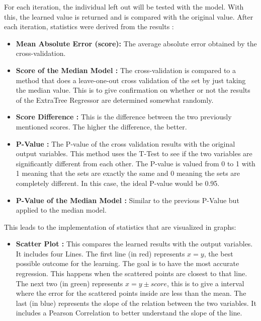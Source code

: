 \documentclass[a4paper,11pt]{report}
\numberwithin{figure}{section} %
\begin{document}
\begin{itemize}
        For each iteration, the individual left out will be tested with the model.
        With this, the learned value is returned and is compared with the original value.
        After each iteration, statistics were derived from the results :
        \begin{itemize}
            \item \textbf{Mean Absolute Error (score):} The average absolute error obtained by the cross-validation.
            \item \textbf{Score of the Median Model :} The cross-validation is compared to a method that does a leave-one-out cross validation of the set by just taking the median value.
            This is to give confirmation on whether or not the results of the ExtraTree Regressor are determined somewhat randomly.
            \item \textbf{Score Difference :} This is the difference between the two previously mentioned scores.
            The higher the difference, the better.
            \item \textbf{P-Value :} The P-value of the cross validation results with the original output variables.
            This method uses the T-Test to see if the two variables are significantly different from each other.
            The P-value is valued from 0 to 1 with 1 meaning that the sets are exactly the same and 0 meaning the sets are completely different.
            In this case, the ideal P-value would be 0.95.
            \item \textbf{P-Value of the Median Model :} Similar to the previous P-Value but applied to the median model.
        \end{itemize}
        This leads to the implementation of statistics that are visualized in graphs:
        \begin{itemize}
            \item \textbf{Scatter Plot :} This compares the learned results with the output variables.
            It includes four Lines.
            The first line (in red) represents $x = y$, the best possible outcome for the learning.
            The goal is to have the most accurate regression.
            This happens when the scattered points are closest to that line.
            The next two (in green) represents $x = y \pm score$, this is to give a interval where the error for the scattered points inside are less than the mean.
            The last (in blue) represents the slope of the relation between the two variables.
            It includes a Pearson Correlation to better understand the slope of the line.

\end{itemize}
\end{itemize}
\end{document}

